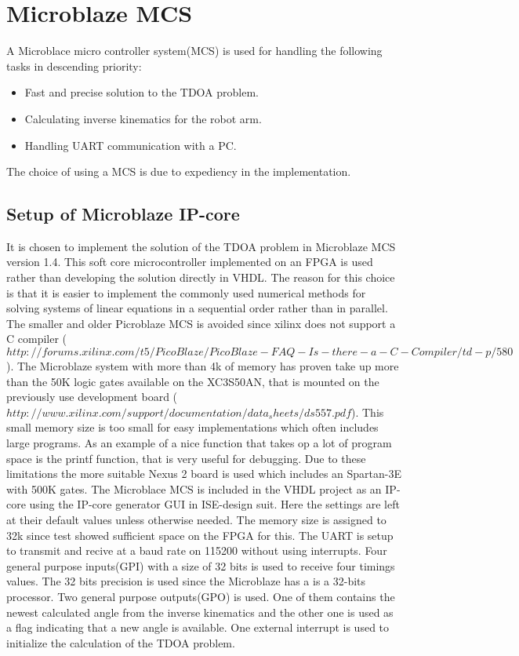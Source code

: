 \section{Microblaze MCS}
A Microblace micro controller system(MCS) is used for handling the following tasks in descending priority:
\begin{itemize}
	\item Fast and precise solution to the TDOA problem.
	\item Calculating inverse kinematics for the robot arm.
	\item Handling UART communication with a PC.
\end{itemize}
The choice of using a MCS is due to expediency in the implementation.
%
\subsection{Setup of Microblaze IP-core} 
It is chosen to implement the solution of the TDOA problem in Microblaze MCS version 1.4. This soft core microcontroller implemented on an FPGA is used rather than developing the solution directly in VHDL. 
The reason for this choice is that it is easier to implement the commonly used numerical methods for solving systems of linear equations in a sequential order rather than in parallel. 
The smaller and older Picroblaze MCS is avoided since xilinx does not support a C compiler  
($http://forums.xilinx.com/t5/PicoBlaze/PicoBlaze-FAQ-Is-there-a-C-Compiler/td-p/580$). 
The Microblaze system with more than 4k of memory has proven take up more than the 50K logic gates available on the XC3S50AN, that is mounted on the previously use development board ($http://www.xilinx.com/support/documentation/data_sheets/ds557.pdf$). 
This small memory size is too small for easy implementations which often includes large programs. As an example of a nice function that takes op a lot of program space is the printf function, that is very useful for debugging.
Due to these limitations the more suitable Nexus 2 board is used which includes an Spartan-3E with 500K gates.  
%
The Microblace MCS is included in the VHDL project as an IP-core using the IP-core generator GUI in ISE-design suit. Here the settings are left at their default values unless otherwise needed. The memory size is assigned to 32k since test showed sufficient space on the FPGA for this. The UART is setup to transmit and recive at a baud rate on 115200 without using interrupts. Four general purpose inputs(GPI) with a size of 32 bits is used to receive four timings values. The 32 bits precision is used since the Microblaze has a is a 32-bits processor. Two general purpose outputs(GPO) is used. One of them contains the newest calculated angle from the inverse kinematics and the other one is used as a flag indicating that a new angle is available. One external interrupt is used to initialize the calculation of the TDOA problem. 
%
